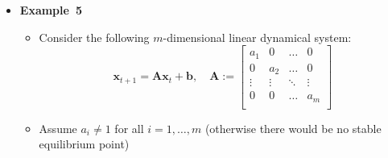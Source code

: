 \documentclass[12pt,a4paper]{article}
\begin{document}
\begin{itemize}
\item \textbf{Example~5}
  \begin{itemize}
  \item Consider the following $m$-dimensional linear dynamical system:
    \begin{equation}\nonumber%
      \bm{x}_{t+1}
      =
      \bm{A}
      \bm{x}_{t} + \bm{b},
      \quad
      \bm{A}:=
      \begin{bmatrix}
        a_{1} & 0 & \ldots & 0 \\
        0 & a_{2} & \ldots & 0 \\
        \vdots & \vdots & \ddots & \vdots \\
        0 & 0 & \ldots & a_{m} \\
      \end{bmatrix}
    \end{equation}

  \item Assume $a_{i}\neq 1$ for all $i=1,\ldots, m$
    (otherwise there would be no stable equilibrium point)


\end{itemize}
\end{itemize}
\end{document}
